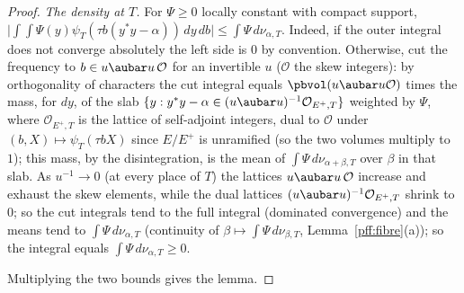 \documentclass[10pt]{amsart}
\theoremstyle{definition}
\theoremstyle{remark}
\begin{document}
\begin{proof}
\emph{The density at $T$.} For $\Psi\ge0$ locally constant with compact support,
$\bigl|\int\!\int\Psi(y)\psi_T(\tau b(y^*y-\alpha))\,dy\,db\bigr|\le\int\Psi\,d\nu_{\alpha,T}$. Indeed, if the
outer integral does not converge absolutely the left side is $0$ by convention. Otherwise, cut the
frequency to $b\in u\aubar u\,\mathcal O$ for an invertible $u$ ($\mathcal O$ the skew integers): by orthogonality of
characters the cut integral equals $\pbvol(u\aubar u\mathcal O)$ times the mass, for $dy$, of the slab
$\{y:y^*y-\alpha\in(u\aubar u)^{-1}\mathcal O_{E^+,T}\}$ weighted by $\Psi$, where $\mathcal O_{E^+,T}$ is the lattice of self-adjoint integers, dual to $\mathcal O$ under
$(b,X)\mapsto\psi_T(\tau bX)$ since $E/E^+$ is unramified (so the two volumes multiply to $1$); this mass, by the disintegration, is the
mean of $\int\Psi\,d\nu_{\alpha+\beta,T}$ over $\beta$ in that slab. As $u^{-1}\to0$ (at every place of $T$) the lattices $u\aubar u\,\mathcal O$ increase and exhaust the skew elements, while the
dual lattices $(u\aubar u)^{-1}\mathcal O_{E^+,T}$ shrink to $0$; so the cut integrals tend
to the full integral (dominated convergence) and the means tend to $\int\Psi\,d\nu_{\alpha,T}$
(continuity of $\beta\mapsto\int\Psi\,d\nu_{\beta,T}$, Lemma~\ref{pff:fibre}(a)); so the integral equals
$\int\Psi\,d\nu_{\alpha,T}\ge0$.

Multiplying the two bounds gives the lemma.
\end{proof}
\end{document}
